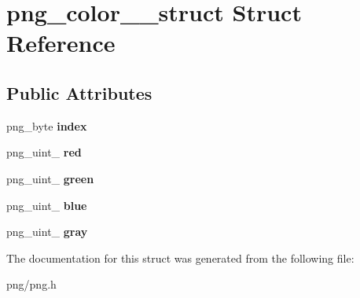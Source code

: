 \hypertarget{structpng__color__16__struct}{}\section{png\+\_\+color\+\_\+\_\+struct Struct Reference}
\label{structpng__color__16__struct}
\subsection*{Public Attributes}
\begin{DoxyCompactItemize}
\item 
png\+\_\+byte {\bfseries index}\hypertarget{structpng__color__16__struct_a44a918da0d9a50cf94fcad5a3c741ee0}{}\label{structpng__color__16__struct_a44a918da0d9a50cf94fcad5a3c741ee0}

\item 
png\+\_\+uint\+\_ {\bfseries red}\hypertarget{structpng__color__16__struct_a069bad345aefbe4eab29fcc1d8af91e6}{}\label{structpng__color__16__struct_a069bad345aefbe4eab29fcc1d8af91e6}

\item 
png\+\_\+uint\+\_ {\bfseries green}\hypertarget{structpng__color__16__struct_af01259ffd46c78eff9b1ad584a295126}{}\label{structpng__color__16__struct_af01259ffd46c78eff9b1ad584a295126}

\item 
png\+\_\+uint\+\_ {\bfseries blue}\hypertarget{structpng__color__16__struct_afd68833319d436582aa5911de7cdd46b}{}\label{structpng__color__16__struct_afd68833319d436582aa5911de7cdd46b}

\item 
png\+\_\+uint\+\_ {\bfseries gray}\hypertarget{structpng__color__16__struct_a660a572a0a2f4094408f2fecb61571ac}{}\label{structpng__color__16__struct_a660a572a0a2f4094408f2fecb61571ac}

\end{DoxyCompactItemize}


The documentation for this struct was generated from the following file\+:\begin{DoxyCompactItemize}
\item 
png/png.\+h\end{DoxyCompactItemize}
